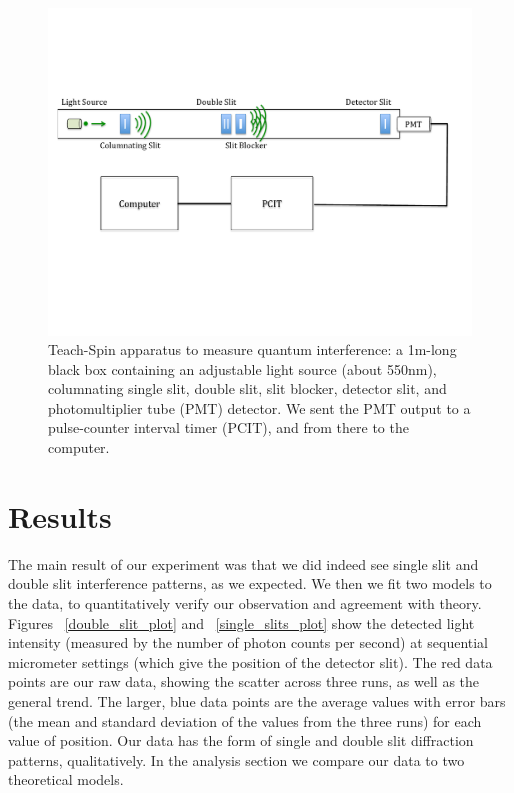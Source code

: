 \documentclass[prb,preprint]{revtex4-1}
\begin{document}
\begin{figure}[h!]
\centering
\includegraphics[width=6in]{set-up.pdf}
\caption{Teach-Spin apparatus to measure quantum interference: a 1m-long black box containing an adjustable light source (about 550nm), columnating single slit, double slit, slit blocker, detector slit, and photomultiplier tube (PMT) detector. We sent the PMT output to a pulse-counter interval timer (PCIT), and from there to the computer.}
\label{set-up}
\end{figure}

\section{Results}

The main result of our experiment was that we did indeed see single slit and double slit interference patterns, as we expected.  We then we fit two models to the data, to quantitatively verify our observation and agreement with theory.  Figures ~\ref{double_slit_plot} and ~\ref{single_slits_plot} show the detected light intensity (measured by the number of photon counts per second) at sequential micrometer settings (which give the position of the detector slit). The red data points are our raw data, showing the scatter across three runs, as well as the general trend. The larger, blue data points are the average values with error bars (the mean and standard deviation of the values from the three runs) for each value of position.  Our data has the form of single and double slit diffraction patterns, qualitatively.  In the analysis section we compare our data to two theoretical models. 
\end{document}
